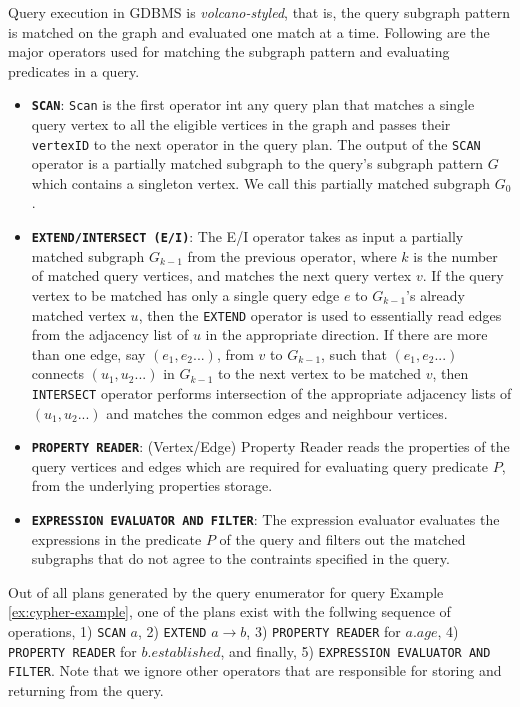 Query execution in GDBMS is \emph{volcano-styled}, that is, the query subgraph pattern is matched on the graph and evaluated one match at a time. Following are the major operators used for matching the subgraph pattern and evaluating predicates in a query.
\begin{itemize}
	
	\item \textbf{\texttt{SCAN}}: \texttt{Scan} is the first operator int any query plan that matches a single query vertex to all the eligible vertices in the graph and passes their \texttt{vertexID} to the next operator in the query plan. The output of the \texttt{SCAN} operator is a partially matched subgraph to the query's subgraph pattern $G$ which contains a singleton vertex. We call this partially matched subgraph $G_0$.
	
	\item \textbf{\texttt{EXTEND/INTERSECT (E/I)}}: The E/I operator takes as input a partially matched subgraph $G_{k-1}$ from the previous operator, where $k$ is the number of matched query vertices, and matches the next query vertex $v$. If the query vertex to be matched has only a single query edge $e$ to $G_{k-1}$'s already matched vertex $u$, then the \texttt{EXTEND} operator is used to essentially read edges from the adjacency list of $u$ in the appropriate direction. If there are more than one edge, say $(e_1, e_2 ...)$, from $v$ to $G_{k-1}$, such that $(e_1, e_2 ...)$ connects $(u_1, u_2 ...)$ in $G_{k-1}$ to the next vertex to be matched $v$, then \texttt{INTERSECT} operator performs intersection of the appropriate adjacency lists of $(u_1, u_2 ...)$ and matches the common edges and neighbour vertices.
	
	\item \textbf{\texttt{PROPERTY READER}}: (Vertex/Edge) Property Reader reads the properties of the query vertices and edges which are required for evaluating query predicate $P$, from the underlying properties storage. 
	
	\item \textbf{\texttt{EXPRESSION EVALUATOR AND FILTER}}: The expression evaluator evaluates the expressions in the predicate $P$ of the query and filters out the matched subgraphs that do not agree to the contraints specified in the query.

\end{itemize}

Out of all plans generated by the query enumerator for query Example \ref{ex:cypher-example}, one of the plans exist with the follwing sequence of operations, 1) \texttt{SCAN} $a$, 2) \texttt{EXTEND} $a{\rightarrow}b$, 3) \texttt{PROPERTY READER} for $a.age$, 4) \texttt{PROPERTY READER} for $b.established$, and finally, 5) \texttt{EXPRESSION EVALUATOR AND FILTER}. Note that we ignore other operators that are responsible for storing and returning from the query.

